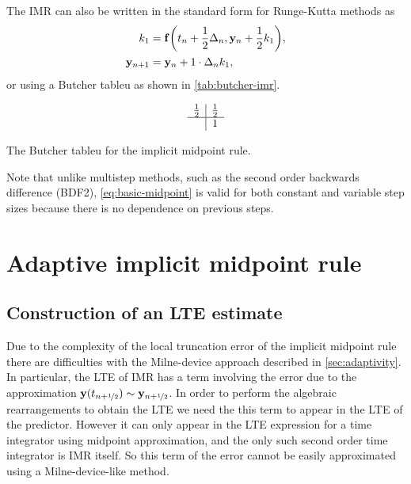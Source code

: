 The IMR can also be written in the standard form for Runge-Kutta methods as
\begin{equation}
  \begin{aligned}
    k_1 &= {\mathbf{f}{\left( t_n + \frac{1}{2} \Delta_{n}, \mathbf{y}_n + \frac{1}{2} k_1 \right)}}, \\
    \mathbf{y}_{n+1} &= \mathbf{y}_n + 1 \cdot \Delta_{n} k_1,
  \end{aligned}
\end{equation}
or using a Butcher tableu \cite[135]{HairerNorsettWanner} as shown in \cref{tab:butcher-imr}.

\begin{table}
  \begin{equation*}
    \begin{array}{c|c}
      \frac{1}{2}  &     \frac{1}{2}  \\
      \hline
                   & 1 \\
    \end{array}
  \end{equation*}
  \caption{The Butcher tableu for the implicit midpoint rule.}
  \label{tab:butcher-imr}
\end{table}

Note that unlike multistep methods, such as the second order backwards difference (BDF2), \cref{eq:basic-midpoint} is valid for both constant and variable step sizes because there is no dependence on previous steps.


\section{Adaptive implicit midpoint rule}

\subsection{Construction of an LTE estimate}

Due to the complexity of the local truncation error of the implicit midpoint rule there are difficulties with the Milne-device approach described in \cref{sec:adaptivity}.
In particular, the LTE of IMR has a term involving the error due to the approximation $\mathbf{y}(t_{n+\nicefrac{1}{2}}) \sim \mathbf{y}_{n+\nicefrac{1}{2}}$.
In order to perform the algebraic rearrangements to obtain the LTE we need the this term to appear in the LTE of the predictor.
However it can only appear in the LTE expression for a time integrator using midpoint approximation, and the only such second order time integrator is IMR itself.
So this term of the error cannot be easily approximated using a Milne-device-like method.

